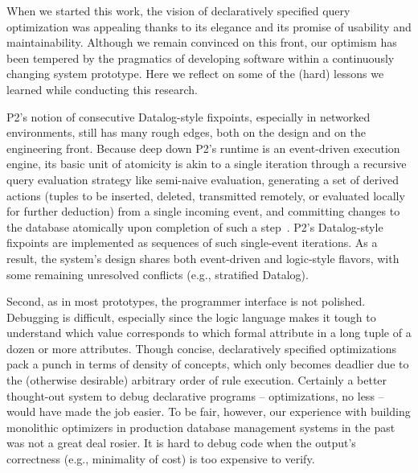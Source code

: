 When we started this work, the vision of declaratively specified query
optimization was appealing thanks to its elegance and its promise of usability
and maintainability.  Although we remain convinced on this front, our optimism
has been tempered by the pragmatics of developing software within a
continuously changing system prototype.  Here we reflect on some of the (hard)
lessons we learned while conducting this research.

P2's notion of consecutive Datalog-style fixpoints, especially in networked
environments, still has many rough edges, both on the design and on the
engineering front.  Because deep down P2's runtime is an event-driven execution
engine, its basic unit of atomicity is akin to a single iteration through a
recursive query evaluation strategy like semi-naive evaluation, generating a
set of derived actions (tuples to be inserted, deleted, transmitted remotely,
or evaluated locally for further deduction) from a single incoming event, and
committing changes to the database atomically upon completion of such a
step~\cite{LuThesis}.  P2's Datalog-style fixpoints are implemented as
sequences of such single-event iterations.  As a result, the system's design
shares both event-driven and logic-style flavors, with some remaining
unresolved conflicts (e.g., stratified Datalog).


Second, as in most prototypes, the programmer interface is not polished.
Debugging is difficult, especially since the logic language makes it tough to
understand which value corresponds to which formal attribute in a long tuple of
a dozen or more attributes.  Though concise, declaratively specified
optimizations pack a punch in terms of density of concepts, which only becomes
deadlier due to the (otherwise desirable) arbitrary order of rule execution.
Certainly a better thought-out system to debug declarative programs --
optimizations, no less -- would have made the job easier.  To be fair, however,
our experience with building monolithic optimizers in production database
management systems in the past was not a great deal rosier.  It is hard to
debug code when the output's correctness (e.g., minimality of cost) is too
expensive to verify.

